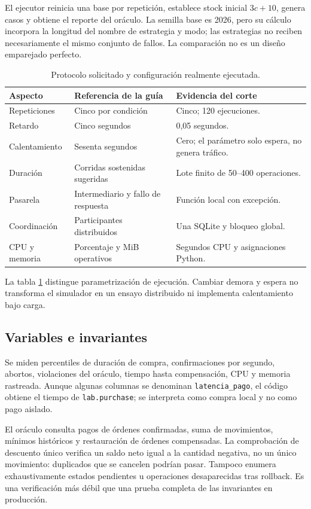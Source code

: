 \documentclass[12pt,a4paper]{article}
\begin{document}
El ejecutor reinicia una base por repetición, establece stock inicial \(3c+10\), genera casos y obtiene el reporte del oráculo. La semilla base es 2026, pero su cálculo incorpora la longitud del nombre de estrategia y modo; las estrategias no reciben necesariamente el mismo conjunto de fallos. La comparación no es un diseño emparejado perfecto.

\begin{table}[H]\centering\small
\caption{Protocolo solicitado y configuración realmente ejecutada.}\label{tab:protocolo}
\begin{tabularx}{\textwidth}{lXX}
\toprule Aspecto & Referencia de la guía & Evidencia del corte\\\midrule
Repeticiones & Cinco por condición & Cinco; 120 ejecuciones.\\
Retardo & Cinco segundos & 0,05 segundos.\\
Calentamiento & Sesenta segundos & Cero; el parámetro solo espera, no genera tráfico.\\
Duración & Corridas sostenidas sugeridas & Lote finito de 50--400 operaciones.\\
Pasarela & Intermediario y fallo de respuesta & Función local con excepción.\\
Coordinación & Participantes distribuidos & Una SQLite y bloqueo global.\\
CPU y memoria & Porcentaje y MiB operativos & Segundos CPU y asignaciones Python.\\\bottomrule
\end{tabularx}
\end{table}

La tabla \ref{tab:protocolo} distingue parametrización de ejecución. Cambiar demora y espera no transforma el simulador en un ensayo distribuido ni implementa calentamiento bajo carga.

\subsection{Variables e invariantes}
Se miden percentiles de duración de compra, confirmaciones por segundo, abortos, violaciones del oráculo, tiempo hasta compensación, CPU y memoria rastreada. Aunque algunas columnas se denominan \texttt{latencia\_pago}, el código obtiene el tiempo de \texttt{lab.purchase}; se interpreta como compra local y no como pago aislado.

El oráculo consulta pagos de órdenes confirmadas, suma de movimientos, mínimos históricos y restauración de órdenes compensadas. La comprobación de descuento único verifica un saldo neto igual a la cantidad negativa, no un único movimiento: duplicados que se cancelen podrían pasar. Tampoco enumera exhaustivamente estados pendientes u operaciones desaparecidas tras rollback. Es una verificación más débil que una prueba completa de las invariantes en producción.
\end{document}
